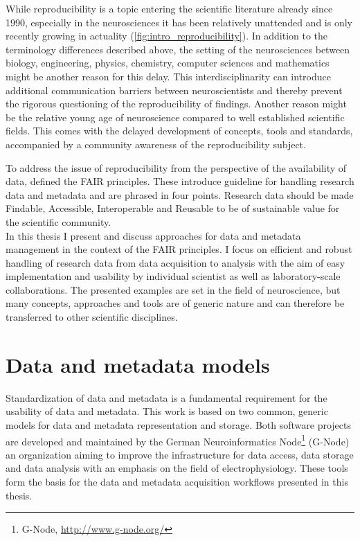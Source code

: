 While reproducibility is a topic entering the scientific literature already since 1990, especially in the neurosciences it has been relatively unattended and is only recently growing in actuality (\cref{fig:intro_reproducibility}). In addition to the terminology differences described above, the setting of the neurosciences between biology, engineering, physics, chemistry, computer sciences and mathematics might be another reason for this delay. This interdisciplinarity can introduce additional communication barriers between neuroscientists and thereby prevent the rigorous questioning of the reproducibility of findings. Another reason might be the relative young age of neuroscience compared to well established scientific fields. This comes with the delayed development of concepts, tools and standards, accompanied by a community awareness of the reproducibility subject.

To address the issue of reproducibility from the perspective of the availability of data, \citet{Wilkinson_2016} defined the FAIR principles. These introduce guideline for handling research data and metadata and are phrased in four points. Research data should be made Findable, Accessible, Interoperable and Reusable to be of sustainable value for the scientific community.\\

In this thesis I present and discuss approaches for data and metadata management in the context of the FAIR principles. I focus on efficient and robust handling of research data from data acquisition to analysis with the aim of easy implementation and usability by individual scientist as well as laboratory-scale collaborations. The presented examples are set in the field of neuroscience, but many concepts, approaches and tools are of generic nature and can therefore be transferred to other scientific disciplines. 



\section{Data and metadata models}
Standardization of data and metadata is a fundamental requirement for the usability of data and metadata. This work is based on two common, generic models for data and metadata representation and storage. Both software projects are developed and maintained by the German Neuroinformatics Node\footnote{G-Node, \url{http://www.g-node.org/}} (G-Node) an organization aiming to improve the infrastructure for data access, data storage and data analysis with an emphasis on the field of electrophysiology. These tools form the basis for the data and metadata acquisition workflows presented in this thesis.

